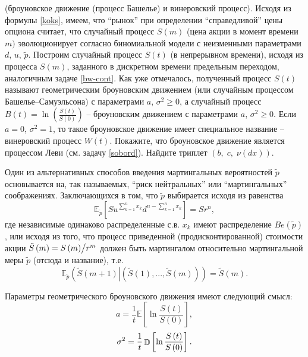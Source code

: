 \begin{problem} (броуновское движение (процесс Башелье) и винеровский процесс). \label{bachelie}
Исходя из формулы \eqref{koks}, имеем, что ``рынок'' при определении 
``справедливой'' цены опциона считает, что случайный процесс $S\left( m 
\right)$ (цена акции в момент времени $m)$ эволюционирует согласно 
биномиальной модели с неизменными параметрами $d$, $u$, $\tilde 
{p}$. Построим случайный процесс $S\left( t \right)$ (в непрерывном 
времени), исходя из процесса $S\left( m \right)$, заданного в дискретном 
времени предельным переходом, аналогичным задаче \ref{bw-cont}. Как уже отмечалось,
полученный процесс $S\left( t \right)$ называют геометрическим 
броуновским движением (или случайным процессом Башелье--Самуэльсона) с 
параметрами $a$, $\sigma ^2\ge 0$, а случайный 
процесс $B\left( t \right)=\ln \left(\frac{S\left( t \right)}{S\left( 0 \right)}\right)$ 
-- броуновским движением с параметрами $a$, $\sigma ^2\ge 0$. Если 
$a=0$, $\sigma ^2=1$, то такое броуновское движение имеет специальное 
название -- винеровский процесс $W\left( t \right)$. Покажите, что 
броуновское движение является процессом Леви (см. задачу \ref{sobord}). Найдите триплет $\left( 
{b,\;c,\;\nu \left( {dx} \right)} \right)$.
\end{problem}
\begin{remark}  Один 
из альтернативных способов введения мартингальных вероятностей $\tilde {p}$ 
основывается на, так называемых, ``риск нейтральных'' или ``мартингальных'' 
соображениях. Заключающихся в том, что $\tilde {p}$ выбирается исходя из 
равенства $$\mathbb{E}_{\tilde {p}} \left[ {Su^{\sum\limits_{k=1}^n {x_k } 
}d^{n-\sum\limits_{k=1}^n {x_k } }} \right]=Sr^n,$$ где независимые одинаково распределенные с.в.  $x_k$ имеют распределение $Be\left( {\tilde {p}} \right)$, или исходя из того, что процесс приведенной 
(продисконтированной) стоимости акции ${\tilde {S}\left( m \right)=S\left( m 
\right)} \mathord{\left/ {\vphantom {{\tilde {S}\left( m \right)=S\left( m 
\right)} {r^m}}} \right. \kern-\nulldelimiterspace} {r^m}$ должен быть 
мартингалом относительно мартингальной меры $\tilde {p}$ (отсюда и 
название), т.е.$$\mathbb{E}_{\tilde {p}} \left( {\left. {\tilde {S}\left( {m+1} 
\right)} \right|\left( {\tilde {S}\left( 1 \right),...,\tilde {S}\left( m 
\right)} \right)} \right)=\tilde {S}\left( m \right).$$

Параметры геометрического броуновского движения имеют следующий смысл: 
$$a=\frac{1}{t}\mathbb{E}\left[ {\ln \frac{S\left( t \right)}{S\left( 0 \right)}} 
\right],$$ 
$$\sigma ^2=\frac{1}{t}\mathop{\mathbb{D}}\nolimits\left[ {\ln \frac{S\left( t 
\right)}{S\left( 0 \right)}} \right].$$
\end{remark}
